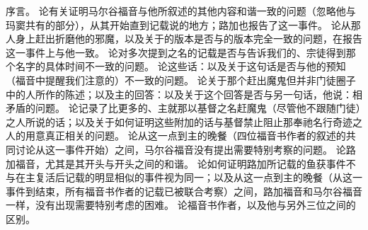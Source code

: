  序言。\newline{} 论有关证明马尔谷福音与他所叙述的其他内容和谐一致的问题（忽略他与玛窦共有的部分），从其开始直到记载说的地方；路加也报告了这一事件。\newline{} 论从那人身上赶出折磨他的邪魔，以及关于的版本是否与的版本完全一致的问题，在报告这一事件上与他一致。\newline{} 论对多次提到之名的记载是否与告诉我们的、宗徒得到那个名字的具体时间不一致的问题。\newline{} 论这些话：以及关于这句话是否与他的预知（福音中提醒我们注意的）不一致的问题。\newline{} 论关于那个赶出魔鬼但并非门徒圈子中的人所作的陈述；以及主的回答：以及关于这个回答是否与另一句话，他说：相矛盾的问题。\newline{} 论记录了比更多的、主就那以基督之名赶魔鬼（尽管他不跟随门徒）之人所说的话；以及关于如何证明这些附加的话与基督禁止阻止那奉祂名行奇迹之人的用意真正相关的问题。\newline{} 论从这一点到主的晚餐（四位福音书作者的叙述的共同讨论从这一事件开始）之间，马尔谷福音没有提出需要特别考察的问题。\newline{} 论路加福音，尤其是其开头与开头之间的和谐。\newline{} 论如何证明路加所记载的鱼获事件不与在主复活后记载的明显相似的事件视为同一；以及从这一点到主的晚餐（从这一事件到结束，所有福音书作者的记载已被联合考察）之间，路加福音和马尔谷福音一样，没有出现需要特别考虑的困难。\newline{} 论福音书作者，以及他与另外三位之间的区别。\par



\section{}

